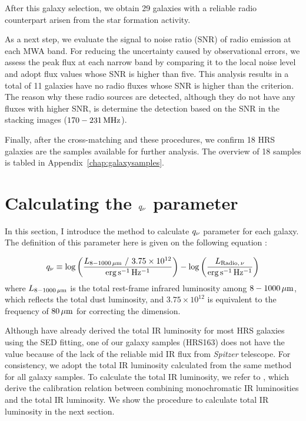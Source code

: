 After this galaxy selection, we obtain 29 galaxies with a reliable radio counterpart arisen from the star formation activity.

As a next step, we evaluate the signal to noise ratio (SNR) of radio emission at each MWA band.
For reducing the uncertainty caused by observational errors, we assess the peak flux at each narrow band by comparing it to the local noise level and adopt flux values whose SNR is higher than five.
This analysis results in a total of 11 galaxies have no radio fluxes whose SNR is higher than the criterion.
The reason why these radio sources are detected, although they do not have any fluxes with higher SNR, is \citet{Hurley-Walker2017a} determine the detection based on the SNR in the stacking images ($170-231\,\mathrm{MHz}$).

Finally, after the cross-matching and these procedures, we confirm 18 HRS galaxies are the samples available for further analysis.
The overview of 18 samples is tabled in Appendix~\ref{chap:galaxysamples}.



\section{Calculating the $q_{\nu}$ parameter}\label{sec:calculatingq}
In this section, I introduce the method to calculate $q_{\nu}$ parameter for each galaxy.
The definition of this parameter here is given on the following equation \citep[e.g.][]{Helou1985, Bell2003, CalistroRivera2017a}:

\begin{equation}\label{eq:q_def}
    q_{\nu} \equiv \log\left(\frac{L_{\mathrm{8-1000\,\mu m}}\ /\ 3.75 \times 10^{12}}{{\rm erg\,s^{-1}\,Hz^{-1}}}\right) - \log\left(\frac{L_{\mathrm{Radio},\,\nu}}{{\rm erg\,s^{-1}\,Hz^{-1}}}\right)
\end{equation}
where $L_{\mathrm{8-1000\,\mu m}}$ is the total rest-frame infrared luminosity among $8 - 1000\,\mathrm{\mu m}$, which reflects the total dust luminosity, and $3.75\times10^{12}$ is equivalent to the frequency of $80\,\mathrm{\mu m}$ for correcting the dimension.

Although \citet{Ciesla2014} have already derived the total IR luminosity for most HRS galaxies using the SED fitting, one of our galaxy samples (HRS163) does not have the value because of the lack of the reliable mid IR flux from {\it Spitzer\/} telescope.
For consistency, we adopt the total IR luminosity calculated from the same method for all galaxy samples.
To calculate the total IR luminosity, we refer to \citet{Galametz2013}, which derive the calibration relation between combining monochromatic IR luminosities and the total IR luminosity.
We show the procedure to calculate total IR luminosity in the next section.



